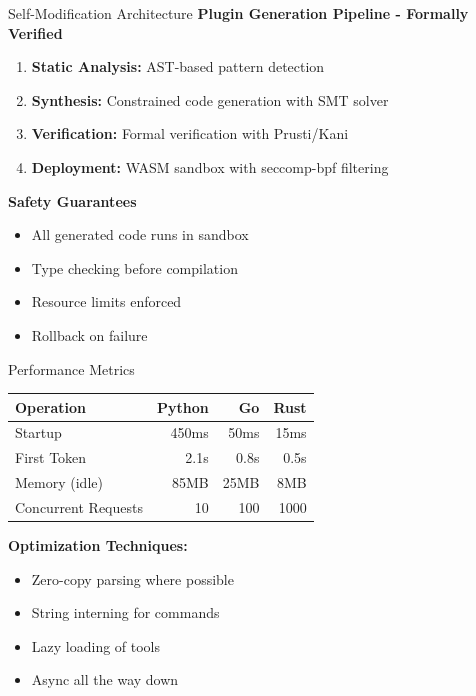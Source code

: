 \documentclass[aspectratio=169]{beamer}
\begin{document}
\begin{frame}{Self-Modification Architecture}
\textbf{Plugin Generation Pipeline - Formally Verified}
\begin{enumerate}
\item \textbf{Static Analysis:} AST-based pattern detection
\item \textbf{Synthesis:} Constrained code generation with SMT solver
\item \textbf{Verification:} Formal verification with Prusti/Kani
\item \textbf{Deployment:} WASM sandbox with seccomp-bpf filtering
\end{enumerate}

\textbf{Safety Guarantees}
\begin{itemize}
\item All generated code runs in sandbox
\item Type checking before compilation
\item Resource limits enforced
\item Rollback on failure
\end{itemize}
\end{frame}

\begin{frame}{Performance Metrics}
\begin{center}
\begin{tabular}{lrrr}
\textbf{Operation} & \textbf{Python} & \textbf{Go} & \textbf{Rust} \\
\hline
Startup & 450ms & 50ms & 15ms \\
First Token & 2.1s & 0.8s & 0.5s \\
Memory (idle) & 85MB & 25MB & 8MB \\
Concurrent Requests & 10 & 100 & 1000 \\
\end{tabular}
\end{center}

\textbf{Optimization Techniques:}
\begin{itemize}
\item Zero-copy parsing where possible
\item String interning for commands
\item Lazy loading of tools
\item Async all the way down
\end{itemize}
\end{frame}
\end{document}
